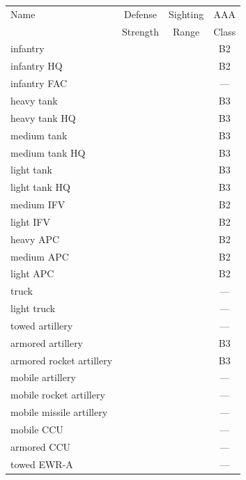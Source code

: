 \begin{tabularx}{0.5\linewidth}{Lccc}
\toprule
Name    &Defense    &Sighting   &AAA    \\
        &Strength   &Range      &Class  \\
\midrule
\addlinespace
infantry&&&B2\\
infantry HQ&&&B2\\
infantry FAC&&&---\\
\addlinespace
heavy tank&&&B3\\
heavy tank HQ&&&B3\\
medium tank&&&B3\\
\addlinespace
medium tank HQ&&&B3\\
light tank&&&B3\\
light tank HQ&&&B3\\
\addlinespace
medium IFV&&&B2\\
light IFV&&&B2\\
heavy APC&&&B2\\
\addlinespace
medium APC&&&B2\\
light APC&&&B2\\
truck&&&---\\
\addlinespace
light truck&&&---\\
towed artillery&&&---\\
armored artillery&&&B3\\
\addlinespace
armored rocket artillery&&&B3\\
mobile artillery&&&---\\
mobile rocket artillery&&&---\\
\addlinespace
mobile missile artillery&&&---\\
mobile CCU&&&---\\
armored CCU&&&---\\
\addlinespace
towed EWR-A&&&---\\

\end{tabularx}
